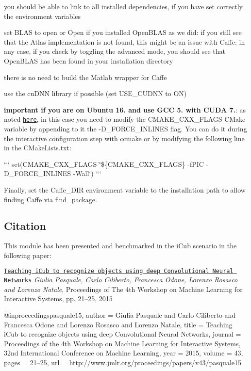 \begin{DoxyItemize}
\item you should be able to link to all installed dependencies, if you have set correctly the environment variables
\item set B\+L\+AS to {\ttfamily open} or {\ttfamily Open} if you installed Open\+B\+L\+AS as we did\+: if you still see that the Atlas implementation is not found, this might be an issue with Caffe\+: in any case, if you check by toggling the advanced mode, you should see that Open\+B\+L\+AS has been found in your installation directory
\item there is no need to build the Matlab wrapper for Caffe
\item use the cu\+D\+NN library if possible (set U\+S\+E\+\_\+\+C\+U\+D\+NN to ON)
\item {\bfseries important if you are on Ubuntu 16. and use G\+CC 5. with C\+U\+DA 7.}\+: as noted \href{https://github.com/BVLC/caffe/issues/4046}{\tt here}, in this case you need to modify the {\ttfamily C\+M\+A\+K\+E\+\_\+\+C\+X\+X\+\_\+\+F\+L\+A\+GS} C\+Make variable by appending to it the {\ttfamily -\/\+D\+\_\+\+F\+O\+R\+C\+E\+\_\+\+I\+N\+L\+I\+N\+ES} flag. You can do it during the interactive configuration step with {\ttfamily ccmake} or by modifying the following line in the {\ttfamily C\+Make\+Lists.\+txt}\+:

``` set(C\+M\+A\+K\+E\+\_\+\+C\+X\+X\+\_\+\+F\+L\+A\+GS \char`\"{}\$\{\+C\+M\+A\+K\+E\+\_\+\+C\+X\+X\+\_\+\+F\+L\+A\+G\+S\} -\/f\+P\+I\+C -\/\+D\+\_\+\+F\+O\+R\+C\+E\+\_\+\+I\+N\+L\+I\+N\+E\+S -\/\+Wall\char`\"{}) ```
\end{DoxyItemize}

Finally, set the {\ttfamily Caffe\+\_\+\+D\+IR} environment variable to the installation path to allow finding Caffe via {\ttfamily find\+\_\+package}.

\subsection*{Citation}

This module has been presented and benchmarked in the i\+Cub scenario in the following paper\+:

\href{http://jmlr.csail.mit.edu/proceedings/papers/v43/pasquale15.pdf}{\tt Teaching i\+Cub to recognize objects using deep Convolutional Neural Networks} {\itshape Giulia Pasquale, Carlo Ciliberto, Francesca Odone, Lorenzo Rosasco and Lorenzo Natale}, Proceedings of The 4th Workshop on Machine Learning for Interactive Systems, pp. 21–25, 2015 \begin{DoxyVerb}@inproceedings{pasquale15,
author  = {Giulia Pasquale and Carlo Ciliberto and Francesca Odone and Lorenzo Rosasco and Lorenzo Natale},
title   = {Teaching iCub to recognize objects using deep Convolutional Neural Networks},
journal = {Proceedings of the 4th Workshop on Machine Learning for Interactive Systems, 32nd International Conference on Machine Learning},
year    = {2015},
volume  = {43},
pages   = {21--25},
url     = {http://www.jmlr.org/proceedings/papers/v43/pasquale15}
}
\end{DoxyVerb}


